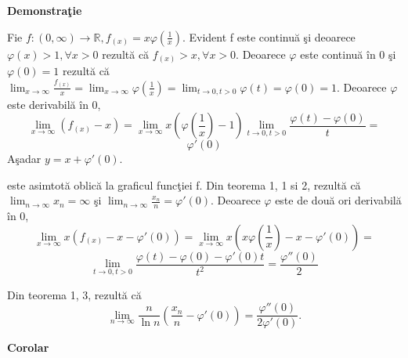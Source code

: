 \documentclass[a4paper,12pt,oneside]{report}
\begin{document}
\textbf{Demonstra\c tie} 

Fie \(f : \left ( 0,\infty  \right ) \to \mathbb{R}, f_{\left ( x \right )}= x\varphi \left ( \frac{1}{x} \right )\). Evident f este continu\u a \c si deoarece \(\varphi \left ( x \right )> 1,\forall x> 0\) rezult\u a c\u a \(f_{\left ( x \right )}> x, \forall x> 0\). Deoarece \(\varphi\) este continu\u a \^ in 0 \c si \(\varphi \left ( 0 \right )= 1\) rezult\u a c\u a \(\lim_{x \to \infty }\frac{f_{\left ( x \right )}}{x} = \lim_{x \to \infty } \varphi \left ( \frac{1}{x} \right ) = \lim_{t \to 0, t> 0 }\varphi \left ( t \right ) = \varphi \left ( 0 \right ) = 1\). Deoarece \(\varphi\) este derivabil\u a \^ in 0, 
\begin{displaymath}
  \lim_{x \to \infty }\left ( f_{\left ( x \right )} -x\right ) = \lim_{x \to \infty } x\left ( \varphi \left ( \frac{1}{x} \right ) -1\right )\lim_{t \to 0, t> 0}\frac{\varphi \left ( t \right ) - \varphi \left ( 0 \right )}{t} = 
\end{displaymath}
\begin{displaymath}
  {\varphi }'\left ( 0 \right )
\end{displaymath}
A\c sadar \(y = x +{\varphi }'\left ( 0 \right )\).
 
este asimtot\u a oblic\u a la graficul func\c tiei f. Din teorema 1, 1 si 2, rezult\u a c\u a \(\lim_{n \to \infty }x_{n} = \infty\) \c si \(\lim_{n \to \infty }\frac{x_{n}}{n} = {\varphi }'\left ( 0 \right )\). Deoarece \(\varphi\) este de dou\u a ori derivabil\u a \^ in 0,
\begin{displaymath}
  \lim_{x \to \infty }x\left ( f_{\left ( x \right ) } -x-{\varphi }'\left ( 0 \right )\right ) = \lim_{x \to \infty }x\left ( x\varphi \left ( \frac{1}{x} \right ) - x - {\varphi }'\left ( 0 \right ) \right ) = \end{displaymath}
\begin{displaymath}
  \lim_{t \to 0, t> 0}\frac{\varphi \left ( t \right ) - \varphi \left ( 0 \right )- {\varphi }'\left ( 0 \right )t}{t^{2}} = \frac{{\varphi }''\left ( 0 \right )}{2}
\end{displaymath}

Din teorema 1, 3, rezult\u a c\u a 
\begin{displaymath}
  \lim_{n \to \infty }\frac{n}{\ln n }\left ( \frac{x_{n}}{n}  - {\varphi }'\left ( 0 \right )\right ) = \frac{{\varphi }''\left ( 0 \right )}{2{\varphi }'\left ( 0 \right )}.
\end{displaymath}
 

\textbf{Corolar} 
\end{document}
